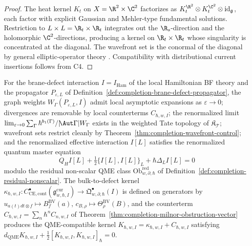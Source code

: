 \begin{proof}
The heat kernel \(K_t\) on \(X=\R^2\times\C^2\) factorizes as
\(K_t^{\R^2}\otimes K_t^{\C^2}\otimes\mathrm{id}_{\mathfrak g}\),
each factor with explicit Gaussian and Mehler-type fundamental
solutions.  Restriction to \(L\times L=\R_t\times\R_t\) integrates
out the \(\R_s\)-direction and the holomorphic \(\C^2\)-directions,
producing a kernel on \(\R_t\times\R_t\) whose singularity is
concentrated at the diagonal.  The wavefront set is the conormal
of the diagonal by general elliptic-operator theory
\cite{hormander-vol1}.  Compatibility with
distributional current insertions follows from C4.
\end{proof}

\begin{thm}
\label{thm:completion-graph-qme}
For the brane-defect interaction
\(I=I_{\mathrm{Ham}}\) of the local Hamiltonian BF theory and the
propagator \(P_{\varepsilon,L}\) of
Definition~\ref{def:completion-brane-defect-propagator}, the
graph weights \(W_\Gamma(P_{\varepsilon,L},I)\) admit local
asymptotic expansions as \(\varepsilon\to 0\); divergences are
removable by local counterterms \(C_{\hbar,w,I}\); the renormalized
limit \(\lim_{\varepsilon\to 0}\sum_\Gamma\hbar^{b_1(\Gamma)}/
|\!\Aut\Gamma|W_\Gamma\) exists in the weighted Tate topology of
\(\mathfrak K_{\mathcal T}\); wavefront sets restrict cleanly by
Theorem~\ref{thm:completion-wavefront-control}; and the
renormalized effective interaction \(I[L]\) satisfies the
renormalized quantum master equation
\[
  Q_HI[L]+\tfrac12\{I[L],I[L]\}_L+\hbar\Delta_LI[L]=0
\]
modulo the residual non-scalar QME class
\(\mathrm{Ob}^{\mathrm{red}}_{w,\partial,\hbar}\) of
Definition~\ref{def:completion-residual-nonscalar}.  The bulk-to-defect
kernel
\(\kappa_{\hbar,w,I}:C^\bullet_{\mathrm{CE,cont}}(\mathfrak g^{\mathrm{cur}}_{w,\hbar,I})
\to\mathfrak Q^\bullet_{w,\partial,\hbar}(I)\) is defined on
generators by \(u_{a(t)dt\otimes f}\mapsto B^{\mathrm{BV}}_f(a)\),
\(c_{B,\rho}\mapsto\Theta^{\mathrm{BV}}_\rho(B)\), and the
counterterm \(C_{\hbar,w,I}=\sum_n\hbar^n C_{n,w,I}\) of
Theorem~\ref{thm:completion-milnor-obstruction-vector} produces the
QME-compatible kernel
\(K_{\hbar,w,I}=\kappa_{\hbar,w,I}+C_{\hbar,w,I}\) satisfying
\(d_{\mathrm{QME}}K_{\hbar,w,I}+\tfrac12[K_{\hbar,w,I},
K_{\hbar,w,I}]_\hbar=0\).
\end{thm}

